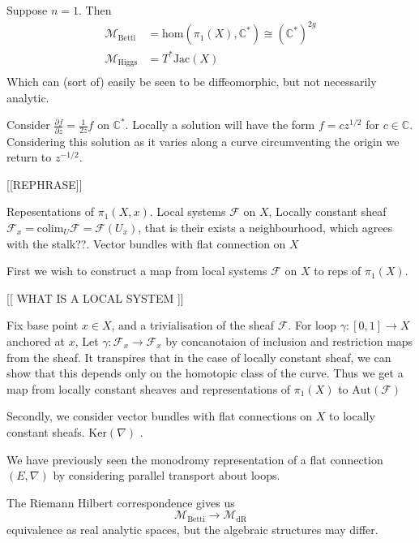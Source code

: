Suppose $n=1$. 
Then 
\begin{align}
    \mathcal{M}_{\mathrm{Betti}} & = \mathrm{hom} ( \pi_1 (X) , \mathbb{C} ^* ) \cong (\mathbb{C} ^*)^{2g} \\
    \mathcal{M}_{\mathrm{Higgs}} & = T^* \mathrm{Jac} ( X) \\
\end{align}
Which can (sort of) easily be seen to be diffeomorphic, but not necessarily analytic. 

Consider $ \frac{\partial f }{ \partial z } = \frac{1}{2z} f $ on $ \mathbb{C} ^* $.
Locally a solution will have the form $ f = c z^{1/2} $ for $c \in \mathbb{C} $. 
Considering this solution as it varies along a curve circumventing the origin we return to $z ^{-1/2} $.

[[REPHRASE]] 

Repesentations of $\pi_1 (X,x) $. 
Local systems $\mathcal{F} $ on $X$,
Locally constant sheaf $ \mathcal{F}_x  = \mathrm{colim} _{U} \mathcal{F} = \mathcal{F}(U_x) $, 
that is their exists a neighbourhood, which agrees with the stalk??.
Vector bundles with flat connection on $X$ 

First we wish to construct a map from local systems $\mathcal{F}$ on $X $ to reps of $\pi_1(X)$. 

[[ WHAT IS A LOCAL SYSTEM ]] 

Fix base point $x \in X$, and a trivialisation of the sheaf $\mathcal{F}$. 
For loop $ \gamma: [0,1] \rightarrow  X$ anchored at $x$, 
Let $ \gamma: \mathcal{F}_x \rightarrow  \mathcal{F}_x $ by concanotaion of inclusion and restriction maps from the sheaf.  
It transpires that in the case of locally constant sheaf, we can show that this depends only on the homotopic class of the curve. 
Thus we get a map from locally constant sheaves and representations of $\pi_1(X) $ to $\mathrm{Aut}(\mathcal{F} ) $ 

Secondly, we consider vector bundles with flat connections on $X$ to locally constant sheafs. 
$ \mathrm{Ker}(\nabla) $ .

We have previously seen the monodromy representation of a flat connection $( E, \nabla ) $ 
by considering parallel transport about loops.

The Riemann Hilbert correspondence gives us
\begin{equation}
    \mathcal{M} _{\mbox{Betti}} \rightarrow \mathcal{M} _{\mbox{dR}} 
\end{equation}
equivalence as real analytic spaces, but the algebraic structures may differ. 









 

